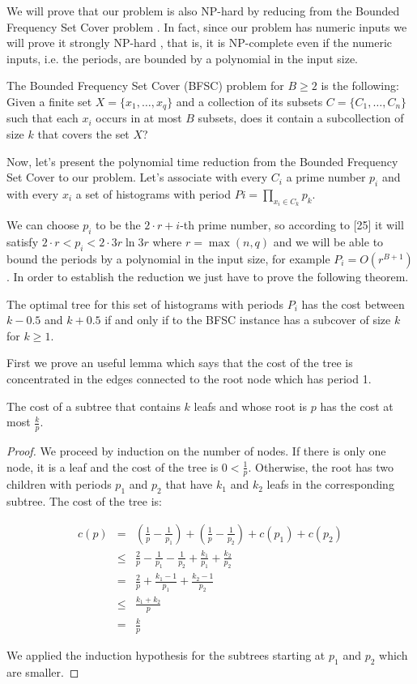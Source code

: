 We will prove that our problem is also NP-hard by reducing from the Bounded Frequency Set Cover problem \citep{gary1979computers, cmulecture}. In fact, since our problem has numeric inputs we will prove it strongly NP-hard \citep{garey1978strong}, that is, it is NP-complete even if the numeric inputs, i.e. the periods, are bounded by a polynomial in the input size.

The Bounded Frequency Set Cover (BFSC) problem for $B \ge 2$ is the following: Given a finite set $X=\{x_1,\ldots,x_q\}$ and a collection of its subsets $C=\{C_1,\ldots, C_n\}$ such that each $x_i$ occurs in at most $B$ subsets, does it contain a subcollection of size $k$ that covers the set $X$?

Now, let’s present the polynomial time reduction from the Bounded Frequency Set Cover to our problem. Let’s associate with every $C_i$ a prime number $p_i$ and with every $x_i$ a set of histograms with period $Pi=\prod_{x_i\in C_k}p_k$.

We can choose $p_i$ to be the $2\cdot r+i$-th prime number, so according to [25] it will satisfy $2\cdot r <p_i<2\cdot 3r \ln 3r$ where $r=\max(n, q)$ and we will be able to bound the periods by a polynomial in the input size, for example $P_i=O(r^{B+1})$. In order to establish the reduction we just have to prove the following theorem. 

\begin{theorem}
The optimal tree for this set of histograms with periods $P_i$ has the cost between $k-0.5$ and $k+0.5$ if and only if to the BFSC instance has a subcover of size $k$ for $k \ge  1$.
\end{theorem}

First we prove an useful lemma which says that the cost of the tree is concentrated in the edges connected to the root node which has period 1.

\begin{lemma}
The cost of a subtree that contains $k$ leafs and whose root is $p$ has the cost at most $\frac{k}{p}$.
\end{lemma}

\begin{proof}
We proceed by induction on the number of nodes. If there is only one node, it is a leaf and the cost of the tree is $0<\frac 1p$. Otherwise, the root has two children with periods $p_1$ and $p_2$ that have $k_1$ and $k_2$ leafs in the corresponding subtree. The cost of the tree is: 

\begin{eqnarray*}
c(p) &=& \left(\frac 1p - \frac 1 {p_1}\right) + \left(\frac 1 p - \frac 1 {p_2}\right)+c(p_1)+c(p_2) \\
    &\leq & \frac 2p-\frac 1 {p_1}-\frac 1 {p_2} + \frac {k_1}{p_1}+\frac {k_2}{p_2} \\
    &=&\frac 2p + \frac{k_1-1}{p_1}+\frac{k_2-1}{p_2} \\
    &\leq & \frac{k_1+k_2}p \\
    &=&\frac kp
\end{eqnarray*}

We applied the induction hypothesis for the subtrees starting at $p_1$ and $p_2$ which are smaller. 
\end{proof}

